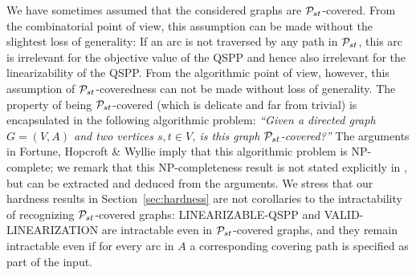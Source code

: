 \documentclass[runningheads]{llncs}
\begin{document}
\begin{appendix}
We have sometimes assumed that the considered graphs are ${\cal P}_{st}$-covered.
From the combinatorial point of view, this assumption can be made without the slightest loss
of generality: If an arc is not traversed by any path in ${\cal P}_{st}$, this arc is irrelevant for
the objective value of the QSPP and hence also irrelevant for the linearizability of the QSPP.
From the algorithmic point of view, however, this assumption of ${\cal P}_{st}$-coveredness can not be
made without loss of generality.
The property of being ${\cal P}_{st}$-covered (which is delicate and far from trivial) is encapsulated
in the following algorithmic problem:
\emph{``Given a directed graph $G=(V,A)$ and two vertices $s,t\in V$, is this graph ${\cal P}_{st}$-covered?''}
The arguments in Fortune, Hopcroft \& Wyllie \cite{FoHoWy1980} imply that this algorithmic
problem is NP-complete; we remark that this NP-completeness result is not stated explicitly in
\cite{FoHoWy1980}, but can be extracted and deduced from the arguments.
We stress that our hardness results in Section~\ref{sec:hardness} are not corollaries to the
intractability of recognizing ${\cal P}_{st}$-covered graphs: LINEARIZABLE-QSPP and VALID-LINEARIZATION
are intractable even in ${\cal P}_{st}$-covered graphs, and they remain intractable even if for every
arc in $A$ a corresponding covering path is specified as part of the input.

\end{appendix}
\end{document}
